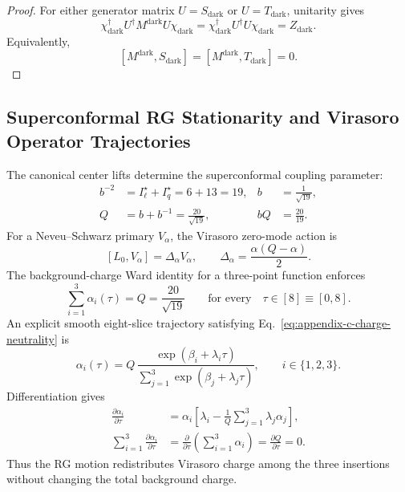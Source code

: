 \documentclass[11pt,letterpaper]{article}
\theoremstyle{plain}
\begin{document}
\begin{proof}
For either generator matrix \(U=S_{\text{dark}}\) or
\(U=T_{\text{dark}}\), unitarity gives
\begin{equation}
\label{eq:dark-unitary-pairing-proof}
 \chi_{\text{dark}}^\dagger U^\dagger M^{\text{dark}}U
 \chi_{\text{dark}}
 =\chi_{\text{dark}}^\dagger U^\dagger U\chi_{\text{dark}}
 =Z_{\text{dark}}.
\end{equation}
Equivalently,
\begin{equation}
\label{eq:dark-commutator-criterion}
 [M^{\text{dark}},S_{\text{dark}}]
 =[M^{\text{dark}},T_{\text{dark}}]=0.
\end{equation}
\end{proof}

\subsection{Superconformal RG Stationarity and Virasoro Operator Trajectories}
\label{app:superconformal-rg-trajectories}

The canonical center lifts determine the superconformal coupling parameter:
\begin{align}
\label{eq:appendix-c-background-charge}
 b^{-2}
 &=
 I_\ell^\star+I_q^\star
 =
 6+13
 =
 19,
 &
 b&=\frac{1}{\sqrt{19}},
 \\
 Q
 &=
 b+b^{-1}
 =
 \frac{20}{\sqrt{19}},
 &
 bQ&=\frac{20}{19}.
\end{align}
For a Neveu--Schwarz primary $V_{\alpha}$, the Virasoro zero-mode action is
\begin{equation}
\label{eq:appendix-c-virasoro-primary}
 [L_0,V_\alpha]
 =
 \Delta_\alpha V_\alpha,
 \qquad
 \Delta_\alpha
 =
 \frac{\alpha(Q-\alpha)}{2}.
\end{equation}
The background-charge Ward identity for a three-point function enforces
\begin{equation}
\label{eq:appendix-c-charge-neutrality}
 \sum_{i=1}^{3}\alpha_i(\tau)
 =
 Q
 =
 \frac{20}{\sqrt{19}}
 \qquad
 \text{for every}\quad
 \tau\in[8]\equiv[0,8].
\end{equation}
An explicit smooth eight-slice trajectory satisfying
Eq.~\eqref{eq:appendix-c-charge-neutrality} is
\begin{equation}
\label{eq:appendix-c-alpha-trajectories}
 \alpha_i(\tau)
 =
 Q\,
 \frac{\exp(\beta_i+\lambda_i\tau)}
 {\displaystyle\sum_{j=1}^{3}\exp(\beta_j+\lambda_j\tau)},
 \qquad
 i\in\{1,2,3\}.
\end{equation}
Differentiation gives
\begin{align}
\label{eq:appendix-c-alpha-flow}
 \frac{\partial\alpha_i}{\partial\tau}
 &=
 \alpha_i
 \left[
 \lambda_i
 -
 \frac{1}{Q}
 \sum_{j=1}^{3}\lambda_j\alpha_j
 \right],
 \\
\label{eq:appendix-c-charge-flow-zero}
 \sum_{i=1}^{3}
 \frac{\partial\alpha_i}{\partial\tau}
 &=
 \frac{\partial}{\partial\tau}
 \left(\sum_{i=1}^{3}\alpha_i\right)
 =
 \frac{\partial Q}{\partial\tau}
 =
 0.
\end{align}
Thus the RG motion redistributes Virasoro charge among the three insertions
without changing the total background charge.
\end{document}
